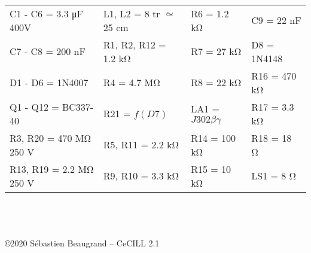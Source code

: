 \documentclass{kibot}
\begin{document}
\begin{center}
~\\
~\\
\\
~\\
~\\
\begin{tabular}{llll}
C1 - C6  = 3.3 \si{\micro\farad} 400\si{\volt}&
L1, L2 = 8 tr $\simeq$ 25 \si{\centi\meter}&
R6 = 1.2 \si{\kilo\ohm}&
C9 = 22 \si{\nano\farad}\\
C7 - C8  = 200 \si{\nano\farad}&
R1, R2, R12 = 1.2 \si{\kilo\ohm}&
R7 = 27 \si{\kilo\ohm}&
D8 = 1N4148\\
D1 - D6  = 1N4007&
R4 = 4.7 \si{\mega\ohm}&
R8 = 22 \si{\kilo\ohm}&
R16 = 470 \si{\kilo\ohm}\\
Q1 - Q12 = BC337-40&
R21 = $f(D7)$&
LA1 = $J302\beta\gamma$&
R17 = 3.3 \si{\kilo\ohm}\\
R3, R20 = 470 \si{\mega\ohm} 250 \si{\volt}&
R5, R11 = 2.2 \si{\kilo\ohm}&
R14 = 100 \si{\kilo\ohm}&
R18 = 18 \si{\ohm}\\
R13, R19 = 2.2 \si{\mega\ohm} 250 \si{\volt}&
R9, R10 = 3.3 \si{\kilo\ohm}&
R15 = 10 \si{\kilo\ohm}&
LS1 = 8 \si{\ohm}
\end{tabular}
\\
~\\
\\
\vfill
\scriptsize
\copyright 2020 Sébastien Beaugrand -- CeCILL 2.1
\end{center}
\end{document}

